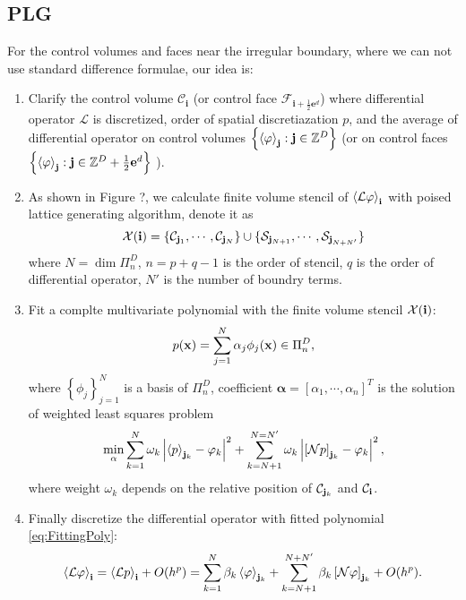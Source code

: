 \subsection{PLG}
\label{sec:PLG}

For the control volumes and faces near the irregular boundary, where
we can not use standard difference formulae, our idea is:
\begin{enumerate}
\item Clarify the control volume $\mathcal{C}_{\mathbf{i}}$ (or
  control face $\mathcal{F}_{\mathbf{i}+\frac{1}{2}\mathbf{e}^d}$)
  where differential operator $\mathcal{L}$ is discretized, order of
  spatial discretiazation $p$, and the average of differential
  operator on control volumes 
  $\left\{\left<\varphi\right>_{{\mathbf{j}}}:{\mathbf{j}}\in\mathbb{Z}^D\right\}$ (or
  on control faces
  $\left\{\left<\varphi\right>_{{\mathbf{j}}}:{\mathbf{j}}\in\mathbb{Z}^D+\frac{1}{2}{\mathbf{e}}^d\right\}$
  ).
\item As shown in Figure ?, we calculate finite volume stencil of
  $\left<\mathcal{L}\varphi\right>_{{\mathbf{i}}}$ with poised lattice
  generating algorithm, denote it as
  \begin{equation}
    \label{eq:Stencil}
    \mathcal{X}({\mathbf{i}}) =
    \{\mathcal{C}_{{\mathbf{j}}_1},\cdots,\mathcal{C}_{{\mathbf{j}}_N}\} \cup
    \{\mathcal{S}_{{\mathbf{j}}_{N+1}},\cdots,\mathcal{S}_{{\mathbf{j}}_{N+N'}}\}
  \end{equation}
  where $N=\dim\Pi_n^D$, $n=p+q-1$ is the order of stencil, $q$ is the
  order of differential operator, $N'$ is the number of boundry terms.
\item Fit a complte multivariate polynomial with the finite volume
  stencil $\mathcal{X}({\mathbf{i}})$:
  \begin{equation}
    \label{eq:FittingPoly}
    p({\mathbf{x}})=\sum\limits_{j=1}^N \alpha_j\phi_j({\mathbf{x}})\in\Pi_n^D,
  \end{equation}
  where $\left\{\phi_j\right\}_{j=1}^N$ is a basis of $\Pi_n^D$,
  coefficient $\mathbf{\alpha} = [\alpha_1,\cdots,\alpha_n]^T$ is the
  solution of weighted least squares problem
  \begin{equation}
    \label{eq:WeightedLSP}
    \min_{\alpha}\sum_{k=1}^N\omega_k\left|\left<p\right>_{{\mathbf{j}}_k} -
      \varphi_k\right|^2 +
    \sum_{k=N+1}^{N=N'}\omega_k\left|\left[\mathcal{N}p\right]_{{\mathbf{j}}_k} -
    \varphi_k\right|^2,
  \end{equation}
  where weight $\omega_k$ depends on the relative position of
  $\mathcal{C}_{{\mathbf{j}}_k}$ and $\mathcal{C}_{{\mathbf{i}}}$.
\item Finally discretize the differential operator with fitted
  polynomial \eqref{eq:FittingPoly}:
  \begin{equation}
    \label{eq:DiscreteOp}
    \left<\mathcal{L}\varphi\right>_{{\mathbf{i}}} =
    \left<\mathcal{L}p\right>_{{\mathbf{i}}}  + O(h^p) =
    \sum_{k=1}^N\beta_k\left<\varphi\right>_{{\mathbf{j}}_k}+
    \sum_{k=N+1}^{N+N'}\beta_k\left[\mathcal{N}\varphi\right]_{{\mathbf{j}}_k} + O(h^p).
  \end{equation}
\end{enumerate}

